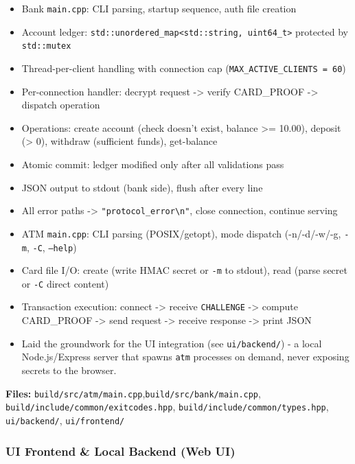 \documentclass[
]{article}
\providecommand{\tightlist}{%
  \setlength{\itemsep}{0pt}\setlength{\parskip}{0pt}}
\begin{document}
\begin{itemize}
\tightlist
\item
  Bank \texttt{main.cpp}: CLI parsing, startup sequence, auth file
  creation
\item
  Account ledger:
  \texttt{std::unordered\_map\textless{}std::string,\ uint64\_t\textgreater{}}
  protected by \texttt{std::mutex}
\item
  Thread-per-client handling with connection cap
  (\texttt{MAX\_ACTIVE\_CLIENTS = 60})
\item
  Per-connection handler: decrypt request -\textgreater{} verify
  CARD\_PROOF -\textgreater{} dispatch operation
\item
  Operations: create account (check doesn't exist, balance \textgreater=
  10.00), deposit (\textgreater{} 0), withdraw (sufficient funds),
  get-balance
\item
  Atomic commit: ledger modified only after all validations pass
\item
  JSON output to stdout (bank side), flush after every line
\item
  All error paths -\textgreater{}
  \texttt{"protocol\_error\textbackslash{}n"}, close connection,
  continue serving
\item
  ATM \texttt{main.cpp}: CLI parsing (POSIX/getopt), mode dispatch
  (-n/-d/-w/-g, \texttt{-m}, \texttt{-C}, \texttt{--help})
\item
  Card file I/O: create (write HMAC secret or \texttt{-m} to stdout),
  read (parse secret or \texttt{-C} direct content)
\item
  Transaction execution: connect -\textgreater{} receive \texttt{CHALLENGE}
  -\textgreater{} compute CARD\_PROOF -\textgreater{} send request
  -\textgreater{} receive response -\textgreater{} print JSON
\item Laid the groundwork for the UI integration (see \texttt{ui/backend/}) - a local Node.js/Express server that spawns \texttt{atm} processes on demand, never exposing secrets to the browser.
\end{itemize}

\textbf{Files:} \texttt{build/src/atm/main.cpp},\texttt{build/src/bank/main.cpp}, \texttt{build/include/common/exitcodes.hpp},
\texttt{build/include/common/types.hpp}, \texttt{ui/backend/}, \texttt{ui/frontend/}

\hypertarget{ui-frontend-backend}{%
\subsubsection{UI Frontend \& Local Backend (Web UI)}}
\end{document}
